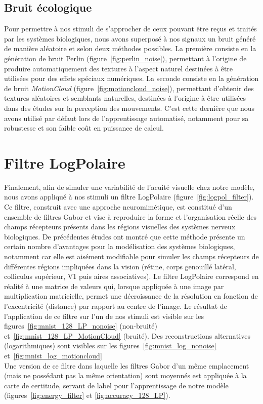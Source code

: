 \subsection{Bruit écologique}
Pour permettre à nos stimuli de s'approcher de ceux pouvant être reçus et traités par les systèmes biologiques, nous avons superposé à nos signaux un bruit généré de manière aléatoire et selon deux méthodes possibles.
La première consiste en la génération de bruit Perlin (figure~\ref{fig:perlin_noise}), permettant à l'origine de produire automatiquement des textures à l'aspect naturel destinées à être utilisées pour des effets spéciaux numériques. \autocite{Perlin1985}
La seconde consiste en la génération de bruit \textit{MotionCloud} (figure~\ref{fig:motioncloud_noise}), permettant d'obtenir des textures aléatoires et semblants naturelles, destinées à l'origine à être utilisées dans des études sur la perception des mouvements.
C'est cette dernière que nous avons utilisé par défaut lors de l'apprentissage automatisé, notamment pour sa robustesse et son faible coût en puissance de calcul. \autocite{Leon2012}

\section{Filtre LogPolaire}
Finalement, afin de simuler une variabilité de l'acuité visuelle chez notre modèle, nous avons appliqué à nos stimuli un filtre LogPolaire (figure~\ref{fig:logpol_filter}).
Ce filtre, construit avec une approche neuromimétique, est constitué d'un ensemble de filtres Gabor et vise à reproduire la forme et l'organisation réelle des champs récepteurs présents dans les régions visuelles des systèmes nerveux biologiques. 
De précédentes études ont montré que cette méthode présente un certain nombre d'avantages pour la modélisation des systèmes biologiques, notamment car elle est aisément modifiable pour simuler les champs récepteurs de différentes régions impliquées dans la vision (rétine, corps genouillé latéral, colliculus supérieur, V1 puis aires associatives).
Le filtre LogPolaire correspond en réalité à une matrice de valeurs qui, lorsque appliquée à une image par multiplication matricielle, permet une décroissance de la résolution en fonction de l'excentricité (distance) par rapport au centre de l'image. 
Le résultat de l'application de ce filtre sur l'un de nos stimuli est visible sur les figures~\ref{fig:mnist_128_LP_nonoise} (non-bruité) et~\ref{fig:mnist_128_LP_MotionCloud} (bruité). Des reconstructions alternatives (logarithmiques) sont visibles sur les figures~\ref{fig:mnist_log_nonoise} et~\ref{fig:mnist_log_motioncloud} \autocite{Freeman2011} \\
Une version de ce filtre dans laquelle les filtres Gabor d'un même emplacement (mais ne possédant pas la même orientation) sont moyennés est appliquée à la carte de certitude, servant de label pour l'apprentissage de notre modèle (figures~\ref{fig:energy_filter} et \ref{fig:accuracy_128_LP}).

